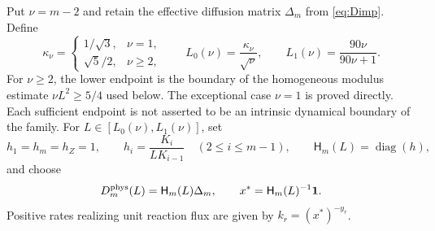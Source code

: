 \documentclass[11pt]{article}
\theoremstyle{definition}
\newcommand{\diag}{\operatorname{diag}}
\newcommand{\1}{\mathbf 1}
\begin{document}
Put $\nu=m-2$ and retain the effective diffusion matrix $\Delta_m$ from
\eqref{eq:Dimp}.  Define
\begin{equation}\label{eq:Lrange}
 \kappa_\nu=\begin{cases}
 1/\sqrt3,&\nu=1,\\
 \sqrt5/2,&\nu\ge2,
 \end{cases}
 \qquad L_0(\nu)=\frac{\kappa_\nu}{\sqrt\nu},\qquad
 L_1(\nu)=\frac{90\nu}{90\nu+1}.
\end{equation}
For $\nu\ge2$, the lower endpoint is the boundary of the homogeneous modulus
estimate $\nu L^2\ge5/4$ used below.  The exceptional case $\nu=1$ is proved
directly.  Each sufficient endpoint is not asserted to be an intrinsic
dynamical boundary of the family.
For $L\in[L_0(\nu),L_1(\nu)]$, set
\begin{equation}\label{eq:HL}
 h_1=h_m=h_Z=1,\qquad
 h_i=\frac{K_i}{LK_{i-1}}\quad(2\le i\le m-1),
 \qquad \mathsf H_m(L)=\diag(h),
\end{equation}
and choose
\begin{equation}\label{eq:Dphys}
 D_m^{\rm phys}(L)=\mathsf H_m(L)\Delta_m,
 \qquad x^*=\mathsf H_m(L)^{-1}\1.
\end{equation}
Positive rates realizing unit reaction flux are given by
$k_r=(x^*)^{-y_r}$.
\end{document}
